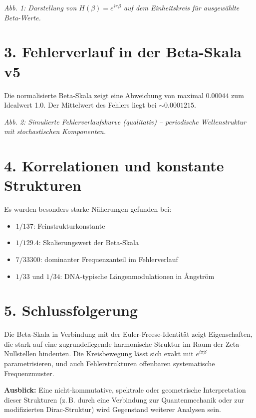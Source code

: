 \documentclass[a4paper,12pt]{article}
\begin{document}
\textit{Abb. 1: Darstellung von $H(\beta) = e^{i\pi\beta}$ auf dem Einheitskreis für ausgewählte Beta-Werte.}

\section*{3. Fehlerverlauf in der Beta-Skala v5}
Die normalisierte Beta-Skala zeigt eine Abweichung von maximal $0.00044$ zum Idealwert 1.0. Der Mittelwert des Fehlers liegt bei $\sim 0.0001215$.

\begin{center}
\end{center}

\textit{Abb. 2: Simulierte Fehlerverlaufskurve (qualitativ) – periodische Wellenstruktur mit stochastischen Komponenten.}

\section*{4. Korrelationen und konstante Strukturen}

Es wurden besonders starke Näherungen gefunden bei:

\begin{itemize}
    \item $1/137$: Feinstrukturkonstante
    \item $1/129.4$: Skalierungswert der Beta-Skala
    \item $7/33300$: dominanter Frequenzanteil im Fehlerverlauf
    \item $1/33$ und $1/34$: DNA-typische Längenmodulationen in Ångström
\end{itemize}

\section*{5. Schlussfolgerung}
Die Beta-Skala in Verbindung mit der Euler-Freese-Identität zeigt Eigenschaften, die stark auf eine zugrundeliegende harmonische Struktur im Raum der Zeta-Nullstellen hindeuten. Die Kreisbewegung lässt sich exakt mit $e^{i\pi\beta}$ parametrisieren, und auch Fehlerstrukturen offenbaren systematische Frequenzmuster.

\vspace{1em}
\textbf{Ausblick:} Eine nicht-kommutative, spektrale oder geometrische Interpretation dieser Strukturen (z.\,B. durch eine Verbindung zur Quantenmechanik oder zur modifizierten Dirac-Struktur) wird Gegenstand weiterer Analysen sein.
\end{document}
